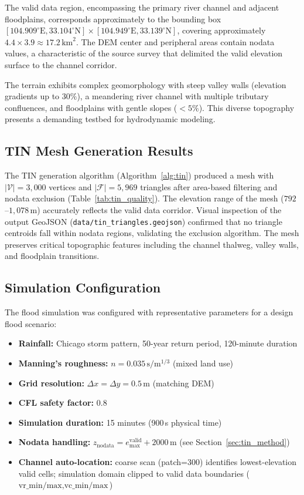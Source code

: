 \documentclass[11pt, a4paper]{article}
\begin{document}
The valid data region, encompassing the primary river channel and adjacent floodplains, corresponds approximately to the bounding box $[104.909^\circ\mathrm{E}, 33.104^\circ\mathrm{N}] \times [104.949^\circ\mathrm{E}, 33.139^\circ\mathrm{N}]$, covering approximately $4.4 \times 3.9 \approx 17.2\,\mathrm{km}^2$. The DEM center and peripheral areas contain nodata values, a characteristic of the source survey that delimited the valid elevation surface to the channel corridor.

The terrain exhibits complex geomorphology with steep valley walls (elevation gradients up to $30\%$), a meandering river channel with multiple tributary confluences, and floodplains with gentle slopes ($<5\%$). This diverse topography presents a demanding testbed for hydrodynamic modeling.

\subsection{TIN Mesh Generation Results}

The TIN generation algorithm (Algorithm~\ref{alg:tin}) produced a mesh with $|\mathcal{V}| = 3{,}000$ vertices and $|\mathcal{F}| = 5{,}969$ triangles after area-based filtering and nodata exclusion (Table~\ref{tab:tin_quality}). The elevation range of the mesh ($792$--$1{,}078$\,m) accurately reflects the valid data corridor. Visual inspection of the output GeoJSON (\texttt{data/tin\_triangles.geojson}) confirmed that no triangle centroids fall within nodata regions, validating the exclusion algorithm. The mesh preserves critical topographic features including the channel thalweg, valley walls, and floodplain transitions.

\subsection{Simulation Configuration}

The flood simulation was configured with representative parameters for a design flood scenario:

\begin{itemize}[leftmargin=1.5em]
  \item \textbf{Rainfall:} Chicago storm pattern, 50-year return period, 120-minute duration
  \item \textbf{Manning's roughness:} $n = 0.035\,\mathrm{s/m^{1/3}}$ (mixed land use)
  \item \textbf{Grid resolution:} $\Delta x = \Delta y = 0.5$\,m (matching DEM)
  \item \textbf{CFL safety factor:} 0.8
  \item \textbf{Simulation duration:} 15 minutes (900\,s physical time)
  \item \textbf{Nodata handling:} $z_{\text{nodata}} = e_{\max}^{\text{valid}} + 2000$\,m (see Section~\ref{sec:tin_method})
  \item \textbf{Channel auto-location:} coarse scan (patch=300) identifies lowest-elevation valid cells; simulation domain clipped to valid data boundaries ($\text{vr\_min/max}, \text{vc\_min/max}$)
\end{itemize}
\end{document}
